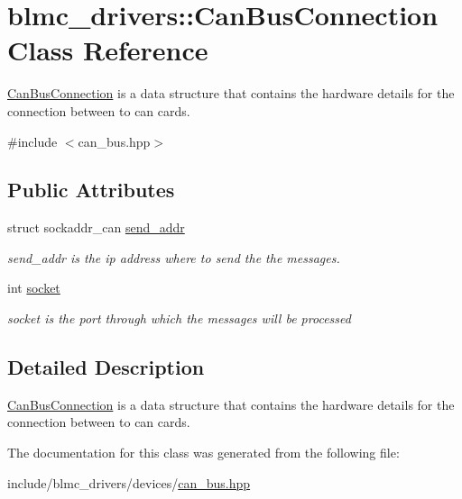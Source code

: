 \hypertarget{classblmc__drivers_1_1CanBusConnection}{}\section{blmc\+\_\+drivers\+:\+:Can\+Bus\+Connection Class Reference}
\label{classblmc__drivers_1_1CanBusConnection}


\hyperlink{classblmc__drivers_1_1CanBusConnection}{Can\+Bus\+Connection} is a data structure that contains the hardware details for the connection between to can cards.  




{\ttfamily \#include $<$can\+\_\+bus.\+hpp$>$}

\subsection*{Public Attributes}
\begin{DoxyCompactItemize}
\item 
struct sockaddr\+\_\+can \hyperlink{classblmc__drivers_1_1CanBusConnection_a9f9e0f2d59955798cfd66ed295b76797}{send\+\_\+addr}\hypertarget{classblmc__drivers_1_1CanBusConnection_a9f9e0f2d59955798cfd66ed295b76797}{}\label{classblmc__drivers_1_1CanBusConnection_a9f9e0f2d59955798cfd66ed295b76797}

\begin{DoxyCompactList}\small\item\em send\+\_\+addr is the ip address where to send the the messages. \end{DoxyCompactList}\item 
int \hyperlink{classblmc__drivers_1_1CanBusConnection_a864cc55d83145a1a54310ef5271f67ea}{socket}\hypertarget{classblmc__drivers_1_1CanBusConnection_a864cc55d83145a1a54310ef5271f67ea}{}\label{classblmc__drivers_1_1CanBusConnection_a864cc55d83145a1a54310ef5271f67ea}

\begin{DoxyCompactList}\small\item\em socket is the port through which the messages will be processed \end{DoxyCompactList}\end{DoxyCompactItemize}


\subsection{Detailed Description}
\hyperlink{classblmc__drivers_1_1CanBusConnection}{Can\+Bus\+Connection} is a data structure that contains the hardware details for the connection between to can cards. 

The documentation for this class was generated from the following file\+:\begin{DoxyCompactItemize}
\item 
include/blmc\+\_\+drivers/devices/\hyperlink{can__bus_8hpp}{can\+\_\+bus.\+hpp}\end{DoxyCompactItemize}
